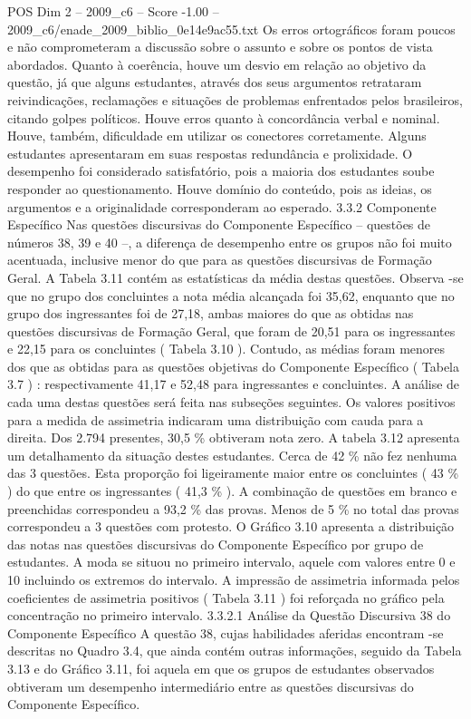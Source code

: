 \begin{textsample}{POS Dim 2 – 2009\_c6 – Score -1.00 – 2009\_c6/enade\_2009\_biblio\_0e14e9ac55.txt}
Os erros ortográficos foram poucos e não comprometeram a discussão sobre o assunto e sobre os pontos de vista abordados.
Quanto à coerência, houve um desvio em relação ao objetivo da questão, já que alguns estudantes, através dos seus argumentos retrataram reivindicações, reclamações e situações de problemas enfrentados pelos brasileiros, citando golpes políticos.
Houve erros quanto à concordância verbal e nominal.
Houve, também, dificuldade em utilizar os conectores corretamente.
Alguns estudantes apresentaram em suas respostas redundância e prolixidade.
O desempenho foi considerado satisfatório, pois a maioria dos estudantes soube responder ao questionamento.
Houve domínio do conteúdo, pois as ideias, os argumentos e a originalidade corresponderam ao esperado. 3.3.2 Componente Específico Nas questões discursivas do Componente Específico – questões de números 38, 39 e 40 –, a diferença de desempenho entre os grupos não foi muito acentuada, inclusive menor do que para as questões discursivas de Formação Geral.
A Tabela 3.11 contém as estatísticas da média destas questões.
Observa -se que no grupo dos concluintes a nota média alcançada foi 35,62, enquanto que no grupo dos ingressantes foi de 27,18, ambas maiores do que as obtidas nas questões discursivas de Formação Geral, que foram de 20,51 para os ingressantes e 22,15 para os concluintes ( Tabela 3.10 ).
Contudo, as médias foram menores dos que as obtidas para as questões objetivas do Componente Específico ( Tabela 3.7 ) : respectivamente 41,17 e 52,48 para ingressantes e concluintes.
A análise de cada uma destas questões será feita nas subseções seguintes.
Os valores positivos para a medida de assimetria indicaram uma distribuição com cauda para a direita.
Dos 2.794 presentes, 30,5 \% obtiveram nota zero.
A tabela 3.12 apresenta um detalhamento da situação destes estudantes.
Cerca de 42 \% não fez nenhuma das 3 questões.
Esta proporção foi ligeiramente maior entre os concluintes ( 43 \% ) do que entre os ingressantes ( 41,3 \% ).
A combinação de questões em branco e preenchidas correspondeu a 93,2 \% das provas.
Menos de 5 \% no total das provas correspondeu a 3 questões com protesto.
O Gráfico 3.10 apresenta a distribuição das notas nas questões discursivas do Componente Específico por grupo de estudantes.
A moda se situou no primeiro intervalo, aquele com valores entre 0 e 10 incluindo os extremos do intervalo.
A impressão de assimetria informada pelos coeficientes de assimetria positivos ( Tabela 3.11 ) foi reforçada no gráfico pela concentração no primeiro intervalo. 3.3.2.1 Análise da Questão Discursiva 38 do Componente Específico A questão 38, cujas habilidades aferidas encontram -se descritas no Quadro 3.4, que ainda contém outras informações, seguido da Tabela 3.13 e do Gráfico 3.11, foi aquela em que os grupos de estudantes observados obtiveram um desempenho intermediário entre as questões discursivas do Componente Específico.

\end{textsample}
